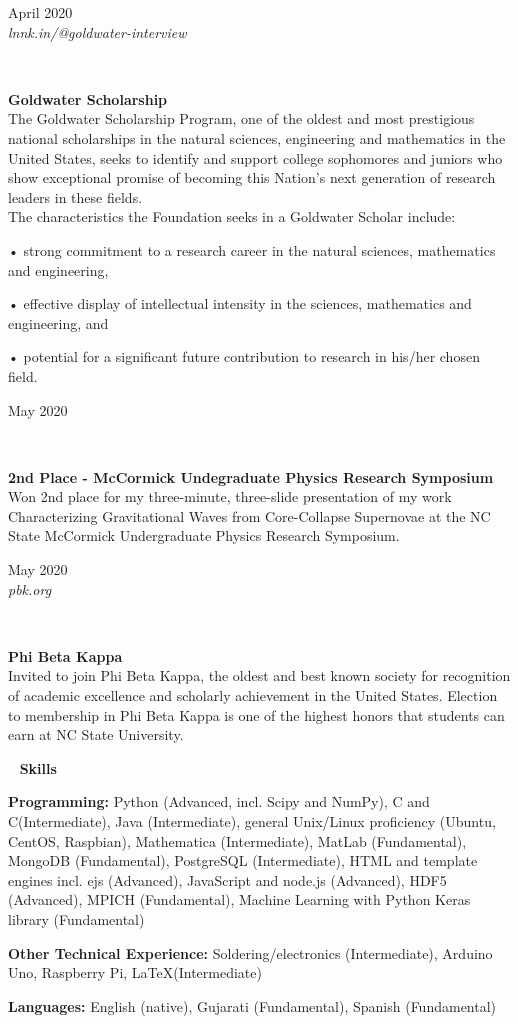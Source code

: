 \documentclass[8pt]{article}
\def \primarycolor   {spacecadet}
\def \tertiarycolor  {airforceblue} %
\def \titlerectmin{0.15cm}
\def \titlerectmax{0.35cm}
\def \leftcolwidth{3.05cm}
\newcommand{\CPP}
{C\nolinebreak[4]\hspace{-.05em}\raisebox{.22ex}{\footnotesize\bf ++}}
\newcommand{\cvheader}[1]{
    \tikz{\fill [\primarycolor] (0,\titlerectmin) rectangle (\leftcolwidth,\titlerectmax);} \ 
    \textcolor{\primarycolor}{ \large{\textbf{#1}} } 
}
\newcommand{\cventry}[4]{
    \begin{minipage}[t]{\leftcolwidth} 
        \small{
            \begin{flushright}
                #2\\
                \textcolor{\tertiarycolor}{\textit{#4}}
            \end{flushright}
        }
    \end{minipage} \ \
    \begin{minipage}[t]{\linewidth-\leftcolwidth} \normalsize{\textbf{#1} \\ #3} \end{minipage}
} %
\begin{document}
\cventry{Goldwater Scholarship}{April 2020}{The Goldwater Scholarship Program, one of the oldest and most prestigious national scholarships in the natural sciences, engineering and mathematics in the United States, seeks to identify and support college sophomores and juniors who show exceptional promise of becoming this Nation’s next generation of research leaders in these fields. \\

The characteristics the Foundation seeks in a Goldwater Scholar include:

    • strong commitment to a research career in the natural sciences, mathematics and engineering,

    • effective display of intellectual intensity in the sciences, mathematics and engineering, and

    • potential for a significant future contribution to research in his/her chosen field.
}{lnnk.in/@goldwater-interview}

\cventry{2nd Place - McCormick Undegraduate Physics Research Symposium}{May 2020}{Won 2nd place for my three-minute, three-slide presentation of my work Characterizing Gravitational Waves from Core-Collapse Supernovae at the NC State McCormick Undergraduate Physics Research Symposium.}{}

\cventry{Phi Beta Kappa}{May 2020}{Invited to join Phi Beta Kappa, the oldest and best known society for recognition of academic excellence and scholarly achievement in the United States. Election to membership in Phi Beta Kappa is one of the highest honors that students can earn at NC State University.}{pbk.org}

\cvheader{Skills}

\begin{description*}
	\item{
	\textbf{Programming:} Python (Advanced, incl. Scipy and NumPy), C and \CPP (Intermediate), Java (Intermediate), general Unix/Linux proficiency (Ubuntu, CentOS, Raspbian), Mathematica (Intermediate), MatLab (Fundamental), MongoDB (Fundamental), PostgreSQL (Intermediate), HTML and template engines incl. ejs (Advanced), JavaScript and node.js (Advanced), HDF5 (Advanced), MPICH (Fundamental), Machine Learning with Python Keras library (Fundamental)
	}
	
	\item{
	\textbf{Other Technical Experience:} Soldering/electronics (Intermediate), Arduino Uno, Raspberry Pi, \LaTeX (Intermediate)
	}
	
	\item{
	\textbf{Languages:} English (native), Gujarati (Fundamental), Spanish (Fundamental)
	}
	
\end{description*}
\end{document}
